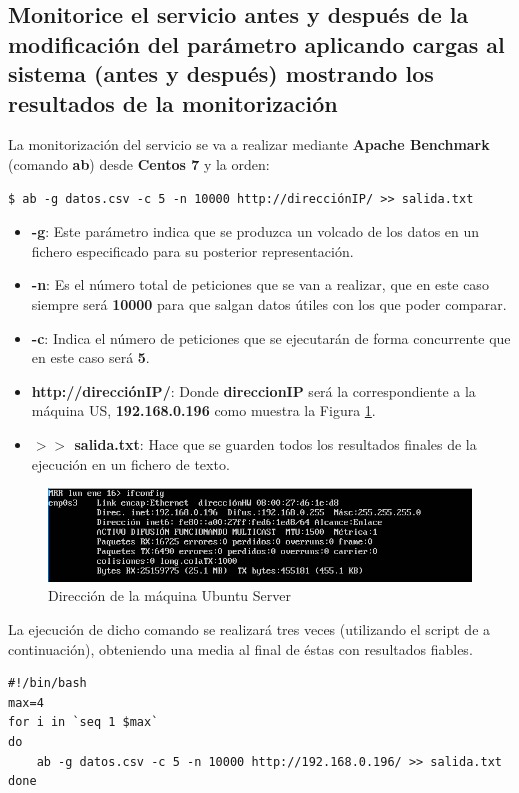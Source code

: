 \subsection{Monitorice el servicio antes y después de
	la modificación del parámetro aplicando cargas al sistema (antes y después)
	mostrando los resultados de la monitorización}

La monitorización del servicio se va a realizar mediante \textbf{Apache Benchmark} (comando \textbf{ab}) desde \textbf{Centos 7} y la orden:
\begin{lstlisting}[style=fich]
$ ab -g datos.csv -c 5 -n 10000 http://direcciónIP/ >> salida.txt
\end{lstlisting}
\vspace{-22pt}
\begin{itemize}
	\item \textbf{-g}: Este parámetro indica que se produzca un volcado de los datos en un fichero especificado para su posterior representación.
	\item \textbf{-n}: Es el número total de peticiones que se van a realizar, que en este caso siempre será \textbf{10000} para que salgan datos útiles con los que poder comparar.
	\item \textbf{-c}: Indica el número de peticiones que se ejecutarán de forma concurrente que en este caso será \textbf{5}.
	\item \textbf{http://direcciónIP/}: Donde \textbf{direccionIP} será la correspondiente a la máquina US, \textbf{192.168.0.196} como muestra la Figura \ref{fig:figura6-2}.
	\item \textbf{$ >> $ salida.txt}: Hace que se guarden todos los resultados finales de la ejecución en un fichero de texto.
\end{itemize}
\vspace{-10pt}	
	\begin{figure}[H] %
		\centering
		\includegraphics[scale=0.8]{figuras/ejercicio6/figura6-2.png} 
		\caption{Dirección de la máquina Ubuntu Server} 
		\label{fig:figura6-2}
	\end{figure}

La ejecución de dicho comando se realizará tres veces (utilizando el script de a continuación), obteniendo una media al final de éstas con resultados fiables.
\begin{lstlisting}[style=cmas]
#!/bin/bash
max=4
for i in `seq 1 $max`
do
	ab -g datos.csv -c 5 -n 10000 http://192.168.0.196/ >> salida.txt
done
\end{lstlisting}

